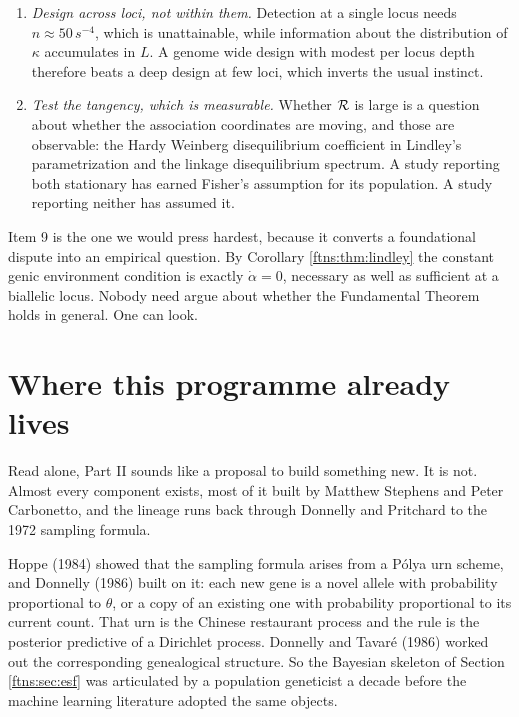 \begin{enumerate}
\item \emph{Design across loci, not within them.} Detection at a single locus needs
$n\approx50\,s^{-4}$, which is unattainable, while information about the distribution of $\kappa$
accumulates in $L$. A genome wide design with modest per locus depth therefore beats a deep design
at few loci, which inverts the usual instinct.

\item \emph{Test the tangency, which is measurable.} Whether $\mathcal{R}$ is large is a question about
whether the association coordinates are moving, and those are observable: the Hardy Weinberg
disequilibrium coefficient in Lindley's parametrization and the linkage disequilibrium spectrum. A
study reporting both stationary has earned Fisher's assumption for its population. A study
reporting neither has assumed it.
\end{enumerate}

Item 9 is the one we would press hardest, because it converts a foundational dispute into an
empirical question. By Corollary \ref{ftns:thm:lindley} the constant genic environment condition is
exactly $\dot\alpha=0$, necessary as well as sufficient at a biallelic locus. Nobody need argue
about whether the Fundamental Theorem holds in general. One can look.


\section{Where this programme already lives}
\label{ftns:sec:lives}

Read alone, Part II sounds like a proposal to build something new. It is not. Almost every
component exists, most of it built by Matthew Stephens and Peter Carbonetto, and the lineage runs
back through Donnelly and Pritchard to the 1972 sampling formula.

Hoppe (1984) showed that the sampling formula arises from a P\'olya urn scheme, and Donnelly (1986) built on it: each new gene is
a novel allele with probability proportional to $\theta$, or a copy of an existing one with
probability proportional to its current count. That urn is the Chinese restaurant process and the
rule is the posterior predictive of a Dirichlet process. Donnelly and Tavar\'e (1986) worked out the
corresponding genealogical structure. So the Bayesian skeleton of Section \ref{ftns:sec:esf} was
articulated by a population geneticist a decade before the machine learning literature adopted the
same objects.

